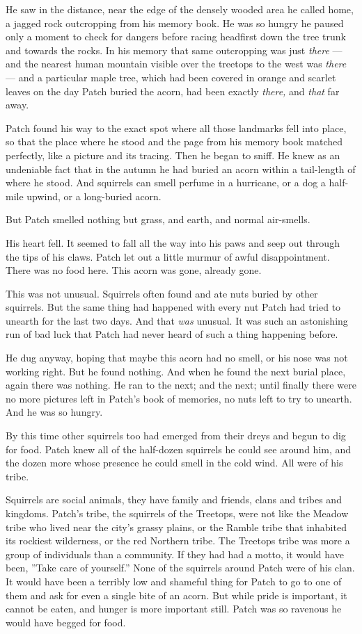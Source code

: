 \documentclass[12pt]{book}
\begin{document}
He saw in the distance, near the edge of the densely wooded area he
called home, a jagged rock outcropping from his memory book. He was so
hungry he paused only a moment to check for dangers before racing
headfirst down the tree trunk and towards the rocks. In his memory
that same outcropping was just \textit{there} --- and the nearest
human mountain visible over the treetops to the west was
\textit{there} --- and a particular maple tree, which had been covered
in orange and scarlet leaves on the day Patch buried the acorn, had
been exactly \textit{there,} and \textit{that} far away.

Patch found his way to the exact spot where all those landmarks fell
into place, so that the place where he stood and the page from his
memory book matched perfectly, like a picture and its tracing. Then he
began to sniff. He knew as an undeniable fact that in the autumn he
had buried an acorn within a tail-length of where he stood. And
squirrels can smell perfume in a hurricane, or a dog a half-mile
upwind, or a long-buried acorn.

But Patch smelled nothing but grass, and earth, and normal air-smells.

His heart fell. It seemed to fall all the way into his paws and seep
out through the tips of his claws. Patch let out a little murmur of
awful disappointment. There was no food here. This acorn was gone,
already gone.

This was not unusual. Squirrels often found and ate nuts buried by
other squirrels. But the same thing had happened with every nut Patch
had tried to unearth for the last two days. And that \textit{was}
unusual. It was such an astonishing run of bad luck that Patch had
never heard of such a thing happening before.

He dug anyway, hoping that maybe this acorn had no smell, or his nose
was not working right. But he found nothing. And when he found the
next burial place, again there was nothing. He ran to the next; and
the next; until finally there were no more pictures left in Patch's
book of memories, no nuts left to try to unearth. And he was so
hungry.

By this time other squirrels too had emerged from their dreys and
begun to dig for food. Patch knew all of the half-dozen squirrels he
could see around him, and the dozen more whose presence he could smell
in the cold wind. All were of his tribe.

Squirrels are social animals, they have family and friends, clans and
tribes and kingdoms. Patch's tribe, the squirrels of the Treetops,
were not like the Meadow tribe who lived near the city's grassy
plains, or the Ramble tribe that inhabited its rockiest wilderness, or
the red Northern tribe. The Treetops tribe was more a group of
individuals than a community. If they had had a motto, it would have
been, ''Take care of yourself.'' None of the squirrels around Patch
were of his clan. It would have been a terribly low and shameful thing
for Patch to go to one of them and ask for even a single bite of an
acorn. But while pride is important, it cannot be eaten, and hunger is
more important still. Patch was so ravenous he would have begged for
food.
\end{document}
